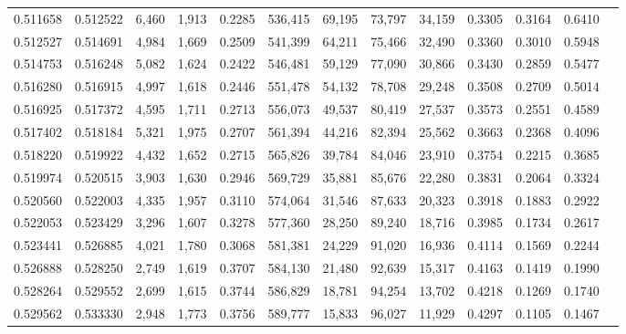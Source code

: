 \begin{tabular}{rrrrrrrrrrrrr}
0.511658 & 0.512522 &  6,460 & 1,913 &                                     0.2285 & 536,415 &  69,195 &  73,797 &  34,159 & 0.3305 & 0.3164 & 0.6410 \\
0.512527 & 0.514691 &  4,984 & 1,669 &                                     0.2509 & 541,399 &  64,211 &  75,466 &  32,490 & 0.3360 & 0.3010 & 0.5948 \\
0.514753 & 0.516248 &  5,082 & 1,624 &                                     0.2422 & 546,481 &  59,129 &  77,090 &  30,866 & 0.3430 & 0.2859 & 0.5477 \\
0.516280 & 0.516915 &  4,997 & 1,618 &                                     0.2446 & 551,478 &  54,132 &  78,708 &  29,248 & 0.3508 & 0.2709 & 0.5014 \\
0.516925 & 0.517372 &  4,595 & 1,711 &                                     0.2713 & 556,073 &  49,537 &  80,419 &  27,537 & 0.3573 & 0.2551 & 0.4589 \\
0.517402 & 0.518184 &  5,321 & 1,975 &                                     0.2707 & 561,394 &  44,216 &  82,394 &  25,562 & 0.3663 & 0.2368 & 0.4096 \\
0.518220 & 0.519922 &  4,432 & 1,652 &                                     0.2715 & 565,826 &  39,784 &  84,046 &  23,910 & 0.3754 & 0.2215 & 0.3685 \\
0.519974 & 0.520515 &  3,903 & 1,630 &                                     0.2946 & 569,729 &  35,881 &  85,676 &  22,280 & 0.3831 & 0.2064 & 0.3324 \\
0.520560 & 0.522003 &  4,335 & 1,957 &                                     0.3110 & 574,064 &  31,546 &  87,633 &  20,323 & 0.3918 & 0.1883 & 0.2922 \\
0.522053 & 0.523429 &  3,296 & 1,607 &                                     0.3278 & 577,360 &  28,250 &  89,240 &  18,716 & 0.3985 & 0.1734 & 0.2617 \\
0.523441 & 0.526885 &  4,021 & 1,780 &                                     0.3068 & 581,381 &  24,229 &  91,020 &  16,936 & 0.4114 & 0.1569 & 0.2244 \\
0.526888 & 0.528250 &  2,749 & 1,619 &                                     0.3707 & 584,130 &  21,480 &  92,639 &  15,317 & 0.4163 & 0.1419 & 0.1990 \\
0.528264 & 0.529552 &  2,699 & 1,615 &                                     0.3744 & 586,829 &  18,781 &  94,254 &  13,702 & 0.4218 & 0.1269 & 0.1740 \\
0.529562 & 0.533330 &  2,948 & 1,773 &                                     0.3756 & 589,777 &  15,833 &  96,027 &  11,929 & 0.4297 & 0.1105 & 0.1467 \\

\end{tabular}
